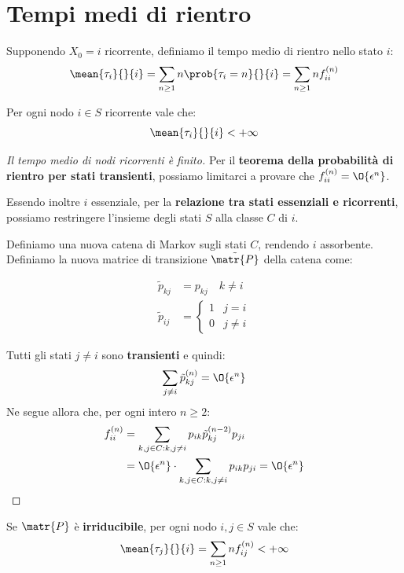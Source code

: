 \documentclass[\main/main.tex]{subfiles}
\begin{document}
\section{Tempi medi di rientro}
\begin{definition}
  Supponendo \(X_0 = i\) ricorrente, definiamo il tempo medio di rientro nello stato \(i\):
  \[
    \mean{\tau_i}{}{i} = \sum_{n \geq 1} n \prob{\tau_i = n}{}{i} = \sum_{n \geq 1} n f^{(n)}_{ii}
  \]
\end{definition}

\begin{theorem}
  Per ogni nodo \(i \in S\) ricorrente vale che:
  \[
    \mean{\tau_i}{}{i} < + \infty
  \]
\end{theorem}

\begin{proof}[Il tempo medio di nodi ricorrenti è finito]
  Per il \textbf{teorema della probabilità di rientro per stati transienti}, possiamo limitarci a provare che \(f^{(n)}_{ii} = \O{\epsilon^n}\).

  Essendo inoltre \(i\) essenziale, per la \textbf{relazione tra stati essenziali e ricorrenti}, possiamo restringere l'insieme degli stati \(S\) alla classe \(C\) di \(i\).

  Definiamo una nuova catena di Markov sugli stati \(C\), rendendo \(i\) assorbente. Definiamo la nuova matrice di transizione \(\tilde{\matr{P}}\) della catena come:

  \begin{align*}
    \tilde{p}_{kj} & = p_{kj} \quad k \neq i     \\
    \tilde{p}_{ij} & = \begin{cases}
      1 & j = i    \\
      0 & j \neq i
    \end{cases}
  \end{align*}

  Tutti gli stati \(j \neq i\) sono \textbf{transienti} e quindi:
  \[
    \sum_{j \neq i} \tilde{p}^{(n)}_{kj} = \O{\epsilon^n}
  \]
  Ne segue allora che, per ogni intero \(n\geq 2\):
  \begin{align*}
    f^{(n)}_{ii} & = \sum_{k, j \in C: k, j \neq i} p_{ik} \tilde{p}^{(n-2)}_{kj}p_{ji}                 \\
                 & = \O{\epsilon^n} \cdot \sum_{k, j \in C: k, j \neq i} p_{ik} p_{ji} = \O{\epsilon^n} \\
  \end{align*}
\end{proof}

\begin{theorem}
  Se \(\matr{P}\) è \textbf{irriducibile}, per ogni nodo \(i, j \in S\) vale che:
  \[
    \mean{\tau_j}{}{i} = \sum_{n \geq 1} n f^{(n)}_{ij} < + \infty
  \]
\end{theorem}
\end{document}
